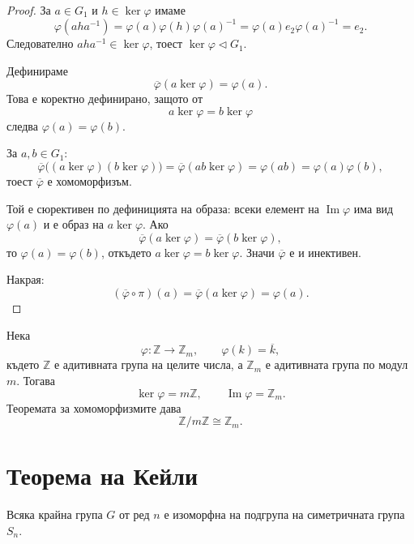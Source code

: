 \begin{proof}
За $a\in G_1$ и $h\in\ker\varphi$ имаме
\[
\varphi(aha^{-1})
=
\varphi(a)\varphi(h)\varphi(a)^{-1}
=
\varphi(a)e_2\varphi(a)^{-1}
=
e_2.
\]
Следователно $aha^{-1}\in\ker\varphi$, тоест $\ker\varphi\triangleleft G_1$.

Дефинираме
\[
\overline{\varphi}(a\ker\varphi)=\varphi(a).
\]
Това е коректно дефинирано, защото от
\[
a\ker\varphi=b\ker\varphi
\]
следва $\varphi(a)=\varphi(b)$.

За $a,b\in G_1$:
\[
\overline{\varphi}\bigl((a\ker\varphi)(b\ker\varphi)\bigr)
=
\overline{\varphi}(ab\ker\varphi)
=
\varphi(ab)
=
\varphi(a)\varphi(b),
\]
тоест $\overline{\varphi}$ е хомоморфизъм.

Той е сюрективен по дефиницията на образа: всеки елемент на $\operatorname{Im}\varphi$ има вид $\varphi(a)$ и е образ на $a\ker\varphi$. Ако
\[
\overline{\varphi}(a\ker\varphi)
=
\overline{\varphi}(b\ker\varphi),
\]
то $\varphi(a)=\varphi(b)$, откъдето $a\ker\varphi=b\ker\varphi$. Значи $\overline{\varphi}$ е и инективен.

Накрая:
\[
(\overline{\varphi}\circ\pi)(a)
=
\overline{\varphi}(a\ker\varphi)
=
\varphi(a).
\]
\end{proof}

\begin{example}
Нека
\[
\varphi\colon \mathbb{Z}\to\mathbb{Z}_m,
\qquad
\varphi(k)=\overline{k},
\]
където $\mathbb{Z}$ е адитивната група на целите числа, а $\mathbb{Z}_m$ е адитивната група по модул $m$. Тогава
\[
\ker\varphi=m\mathbb{Z},
\qquad
\operatorname{Im}\varphi=\mathbb{Z}_m.
\]
Теоремата за хомоморфизмите дава
\[
\mathbb{Z}/m\mathbb{Z}\cong\mathbb{Z}_m.
\]
\end{example}

\section{Теорема на Кейли}\label{s:31.6}

\begin{keythm}
Всяка крайна група $G$ от ред $n$ е изоморфна на подгрупа на симетричната група $S_n$.
\end{keythm}

